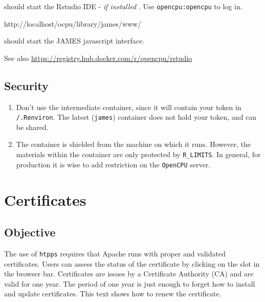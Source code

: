 \documentclass[
]{book}
\newenvironment{Shaded}{\begin{snugshade}}{\end{snugshade}}
\newcommand{\ExtensionTok}[1]{#1}
\providecommand{\tightlist}{%
  \setlength{\itemsep}{0pt}\setlength{\parskip}{0pt}}
\begin{document}
should start the Rstudio IDE - \emph{if installed} . Use \texttt{opencpu:opencpu} to log in.

\begin{Shaded}
\begin{Highlighting}[]
\ExtensionTok{http://localhost/ocpu/library/james/www/}
\end{Highlighting}
\end{Shaded}

should start the JAMES javascript interface.

See also \url{https://registry.hub.docker.com/r/opencpu/rstudio}

\hypertarget{security}{%
\section{Security}\label{security}}

\begin{enumerate}
\def\labelenumi{\arabic{enumi}.}
\tightlist
\item
  Don't use the intermediate container, since it will contain your token in \texttt{/.Renviron}. The latest (\texttt{james}) container does not hold your token, and can be shared.
\item
  The container is shielded from the machine on which it runs. However, the materials within the container are only protected by \texttt{R\_LIMITS}. In general, for production it is wise to add restriction on the \texttt{OpenCPU} server.
\end{enumerate}

\hypertarget{certificates}{%
\chapter{Certificates}\label{certificates}}

\hypertarget{objective-3}{%
\section{Objective}\label{objective-3}}

The use of \texttt{htpps} requires that Apache runs with proper and validated certificates. Users can assess the status of the certificate by clicking on the slot in the browser bar. Certificates are issues by a Certificate Authority (CA) and are valid for one year. The period of one year is just enough to forget how to install and update certificates. This text shows how to renew the certificate.
\end{document}

